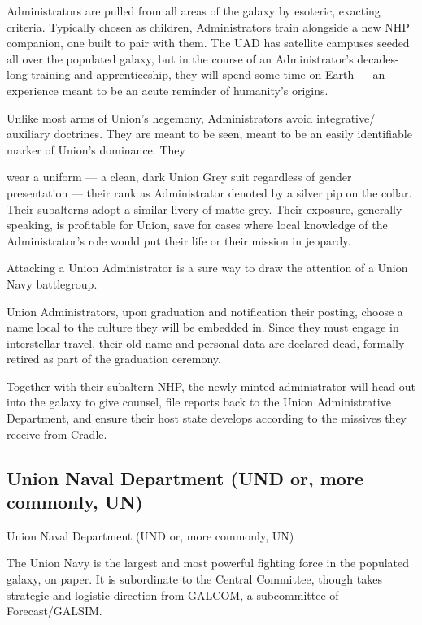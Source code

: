 Administrators are pulled from all areas of the galaxy by esoteric, exacting criteria. Typically  
chosen as children, Administrators train alongside a new NHP companion, one built to pair with  
them. The UAD has satellite campuses seeded all over the populated galaxy, but in the course of  
an Administrator’s decades-long training and apprenticeship, they will spend some time on Earth  
— an experience meant to be an acute reminder of humanity’s origins. 
 

Unlike most arms of Union’s hegemony, Administrators avoid integrative/ auxiliary doctrines.  
They are meant to be seen, meant to be an easily identifiable marker of Union’s dominance. They  

                                                                                                                  


wear a uniform — a clean, dark Union Grey suit regardless of gender presentation — their rank  
as Administrator denoted by a silver pip on the collar. Their subalterns adopt a similar livery of  
matte grey. Their exposure, generally speaking, is profitable for Union, save for cases where local  
knowledge of the Administrator’s role would put their life or their mission in jeopardy. 
 

Attacking a Union Administrator is a sure way to draw the attention of a Union Navy battlegroup.   
 

Union Administrators, upon graduation and notification their posting, choose a name local to the  
culture they will be embedded in. Since they must engage in interstellar travel, their old name  
and personal data are declared dead, formally retired as part of the graduation ceremony. 
 

Together with their subaltern NHP, the newly minted administrator will head out into the galaxy to  
give counsel, file reports back to the Union Administrative Department, and ensure their host  
state develops according to the missives they receive from Cradle.   
 
\subsection{Union Naval Department (UND or, more commonly, UN)}
Union Naval Department (UND or, more commonly, UN)  

The Union Navy is the largest and most powerful fighting force in the populated galaxy, on paper.  
It is subordinate to the Central Committee, though takes strategic and logistic direction from  
GALCOM, a subcommittee of Forecast/GALSIM.
 

